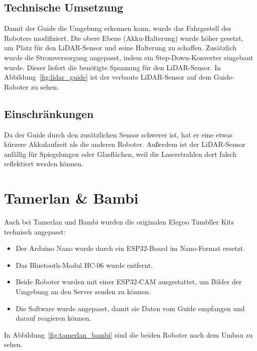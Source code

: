 \subsection{Technische Umsetzung}
Damit der Guide die Umgebung erkennen kann, wurde das Fahrgestell des Roboters modifiziert.
%
Die obere Ebene (Akku-Halterung) wurde höher gesetzt, um Platz für den LiDAR-Sensor und seine Halterung zu schaffen.
%
Zusätzlich wurde die Stromversorgung angepasst, indem ein Step-Down-Konverter eingebaut wurde.
%
Dieser liefert die benötigte Spannung für den LiDAR-Sensor.
%
In Abbildung~\ref{fig:lidar_guide} ist der verbaute LiDAR-Sensor auf dem Guide-Roboter zu sehen.

\subsection{Einschränkungen}
Da der Guide durch den zusätzlichen Sensor schwerer ist, hat er eine etwas kürzere Akkulaufzeit als die anderen Roboter.
%
Außerdem ist der LiDAR-Sensor anfällig für Spiegelungen oder Glasflächen,
weil die Laserstrahlen dort falsch reflektiert werden können.

\section{Tamerlan \& Bambi}
\label{subsec:hardware_tamerlan_bambi}
%
Auch bei Tamerlan und Bambi wurden die originalen Elegoo Tumbller Kits technisch angepasst:
\begin{itemize}
    \item Der Arduino Nano wurde durch ein ESP32-Board im Nano-Format ersetzt.
    \item Das Bluetooth-Modul HC-06 wurde entfernt.
    \item Beide Roboter wurden mit einer ESP32-CAM ausgestattet, um Bilder der Umgebung an den Server senden zu können.
    \item Die Software wurde angepasst, damit sie Daten vom Guide empfangen und darauf reagieren können.
\end{itemize}
In Abbildung~\ref{fig:tamerlan_bambi} sind die beiden Roboter nach dem Umbau zu sehen.